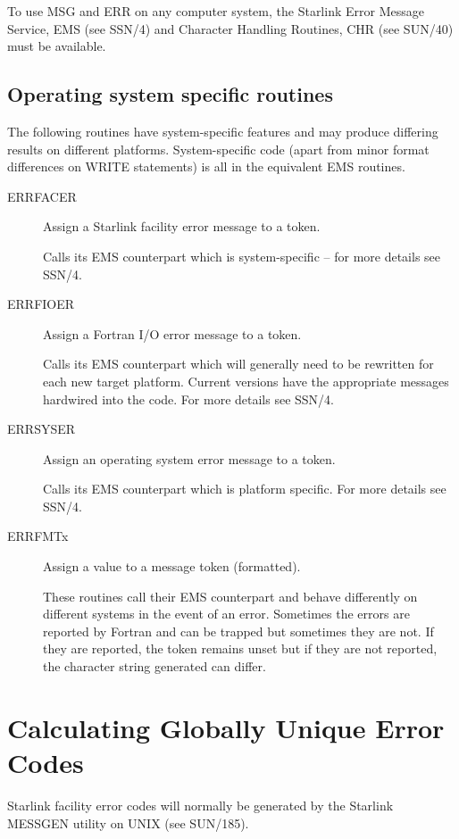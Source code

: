 \documentclass[twoside,11pt]{article}
\newcommand{\latex}[1]{#1}
\newcommand{\xref}[3]{#1}
\newcommand{\xlabel}[1]{}
\renewcommand{\_}{\texttt{\symbol{95}}}
\begin{document}
To use MSG and ERR on any computer system, the Starlink Error Message Service,
\xref{EMS}{ssn4}{abstract} \latex{(see SSN/4)}
and Character Handling Routines,
\xref{CHR}{sun40}{abstract} \latex{(see SUN/40)}
must be available.


\subsection{\xlabel{operating_system_specific_routines}Operating system specific routines \label{dep_sect}}
The following routines have system-specific features and may produce differing
results on different platforms. System-specific code (apart from minor format
differences on WRITE statements) is all in the equivalent EMS routines.
\begin{description}
\item [ERR\_FACER] Assign a Starlink facility error message to a token.

Calls its EMS counterpart which is system-specific -- for more details see
\xref{SSN/4}{ssn4}{operating_system_specific_routines}.
\item [ERR\_FIOER] Assign a Fortran I/O error message to a token.

Calls its EMS counterpart which will generally need to be rewritten for each
new target platform.
Current versions have the appropriate messages hardwired into the code.
For more details see \xref{SSN/4}{ssn4}{operating_system_specific_routines}.
\item [ERR\_SYSER] Assign an operating system error message to a token.

Calls its EMS counterpart which is platform specific.
For more details see \xref{SSN/4}{ssn4}{operating_system_specific_routines}.
\item [ERR\_FMTx] Assign a value to a message token (formatted).

These routines call their EMS counterpart and behave differently on different
systems in the event of an error.
Sometimes the errors are reported by Fortran and can be trapped but
sometimes they are not. If they are reported, the token remains unset but
if they are not reported, the character string generated can differ.
\end {description}

\section{\xlabel{calculating_globally_unique_error_codes}Calculating Globally Unique Error Codes \label{stat_sect}}
Starlink facility error codes will normally be generated by the Starlink
\xref{MESSGEN}{sun185}{} utility on UNIX\latex{ (see SUN/185)}.
\end{document}
